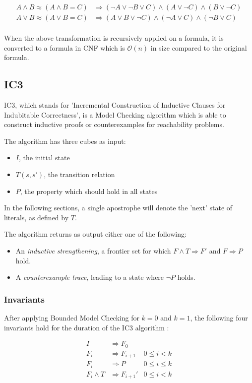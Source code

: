 \documentclass[a4paper]{article}
\begin{document}
\begin{align*}
A \land B \approx (A \land B = C) &\Rightarrow (\lnot A \lor \lnot B \lor C) \land (A \lor \lnot C) \land (B \lor \lnot C)\\
A \lor B \approx (A \lor B = C) &\Rightarrow (A \lor B \lor \lnot C) \land (\lnot A \lor  C) \land (\lnot B \lor   C)\\
\end{align*}

When the above transformation is recursively applied on a formula, it is converted to a formula in CNF which is $\mathcal{O}(n)$ in size compared to the original formula.

\newpage
\subsection{IC3}
IC3, which stands for 'Incremental Construction of Inductive Clauses for Indubitable Correctness', is a Model Checking algorithm which is able to construct inductive proofs or counterexamples for reachability problems.

The algorithm has three cubes as input:
\begin{itemize}
\item $I$, the initial state
\item $T(s,s')$, the transition relation
\item $P$, the property which should hold in all states
\end{itemize}

In the following sections, a single apostrophe will denote the 'next' state of literals, as defined by $T$.

The algorithm returns as output either one of the following:
\begin{itemize}
\item An \emph{inductive strengthening}, a frontier set for which $F \land T \Rightarrow F'$ and $F \Rightarrow P$ hold.
\item A \emph{counterexample trace}, leading to a state where $\lnot P$ holds.
\end{itemize}

\subsubsection{Invariants}
After applying Bounded Model Checking for $k=0$ and $k=1$, the following four invariants hold for the duration of the IC3 algorithm \cite{Bradley2011}:

\setcounter{equation}{0}
\begin{align}
I &\Rightarrow F_0\\
F_i &\Rightarrow F_{i+1} & 0 \leq i < k\\
F_i &\Rightarrow P & 0 \leq i \leq k\\
F_i \land T &\Rightarrow F_{i+1}' & 0 \leq i < k
\end{align}
\end{document}
